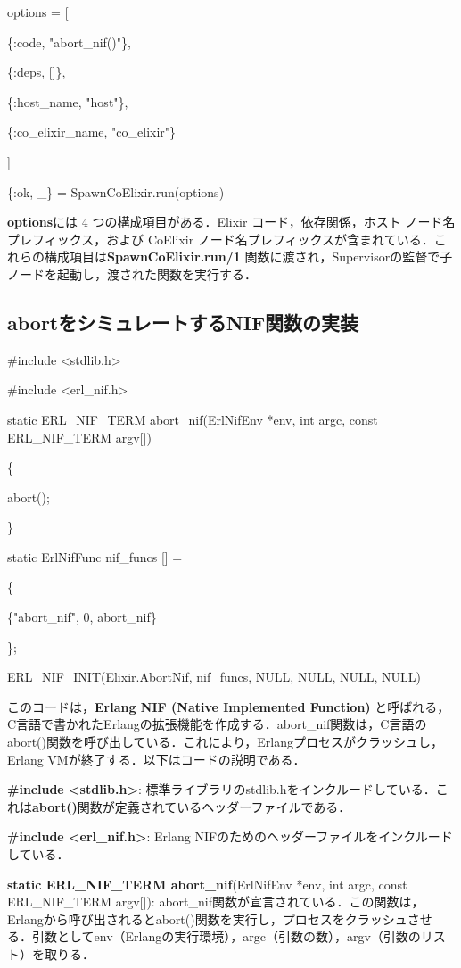 \documentclass[a4paper]{jreport}	%
\begin{document}
options = [

\{:code, "abort\_nif()"\},

\{:deps, []\},

\{:host\_name, "host"\},

\{:co\_elixir\_name, "co\_elixir"\}

]

\{:ok, \_\} = SpawnCoElixir.run(options)

\textbf{options}には 4 つの構成項目がある．Elixir コード，依存関係，ホスト ノード名プレフィックス，および CoElixir ノード名プレフィックスが含まれている．これらの構成項目は\textbf{SpawnCoElixir.run/1} 関数に渡され，Supervisorの監督で子ノードを起動し，渡された関数を実行する．

\subsection{abortをシミュレートするNIF関数の実装}

\#include <stdlib.h>

\#include <erl\_nif.h>

static ERL\_NIF\_TERM abort\_nif(ErlNifEnv *env, int argc, const ERL\_NIF\_TERM argv[])

\{

    abort();
    
\}

static ErlNifFunc nif\_funcs [] =

\{

    \{"abort\_nif", 0, abort\_nif\}
    
\};

ERL\_NIF\_INIT(Elixir.AbortNif, nif\_funcs, NULL, NULL, NULL, NULL)

このコードは，\textbf{Erlang NIF (Native Implemented Function)} と呼ばれる，C言語で書かれたErlangの拡張機能を作成する．abort\_nif関数は，C言語のabort()関数を呼び出している．これにより，Erlangプロセスがクラッシュし，Erlang VMが終了する．以下はコードの説明である．

\textbf{\#include <stdlib.h>}: 標準ライブラリのstdlib.hをインクルードしている．これは\textbf{abort()}関数が定義されているヘッダーファイルである．

\textbf{\#include <erl\_nif.h>}: Erlang NIFのためのヘッダーファイルをインクルードしている．

\textbf{static ERL\_NIF\_TERM abort\_nif}(ErlNifEnv *env, int argc, const ERL\_NIF\_TERM argv[]): abort\_nif関数が宣言されている．この関数は，Erlangから呼び出されるとabort()関数を実行し，プロセスをクラッシュさせる．引数としてenv（Erlangの実行環境），argc（引数の数），argv（引数のリスト）を取りる．
\end{document}
